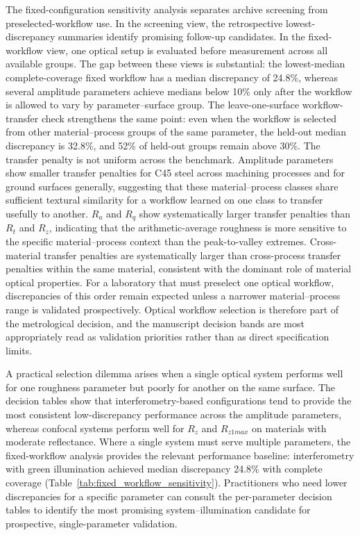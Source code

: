 \documentclass{article}
\begin{document}
The fixed-configuration sensitivity analysis separates archive screening from preselected-workflow use. In the screening view, the retrospective lowest-discrepancy summaries identify promising follow-up candidates. In the fixed-workflow view, one optical setup is evaluated before measurement across all available groups. The gap between these views is substantial: the lowest-median complete-coverage fixed workflow has a median discrepancy of 24.8\%, whereas several amplitude parameters achieve medians below 10\% only after the workflow is allowed to vary by parameter--surface group. The leave-one-surface workflow-transfer check strengthens the same point: even when the workflow is selected from other material--process groups of the same parameter, the held-out median discrepancy is 32.8\%, and 52\% of held-out groups remain above 30\%. The transfer penalty is not uniform across the benchmark. Amplitude parameters show smaller transfer penalties for C45 steel across machining processes and for ground surfaces generally, suggesting that these material--process classes share sufficient textural similarity for a workflow learned on one class to transfer usefully to another. $R_a$ and $R_q$ show systematically larger transfer penalties than $R_t$ and $R_z$, indicating that the arithmetic-average roughness is more sensitive to the specific material--process context than the peak-to-valley extremes. Cross-material transfer penalties are systematically larger than cross-process transfer penalties within the same material, consistent with the dominant role of material optical properties. For a laboratory that must preselect one optical workflow, discrepancies of this order remain expected unless a narrower material--process range is validated prospectively. Optical workflow selection is therefore part of the metrological decision, and the manuscript decision bands are most appropriately read as validation priorities rather than as direct specification limits.

A practical selection dilemma arises when a single optical system performs well for one roughness parameter but poorly for another on the same surface. The decision tables show that interferometry-based configurations tend to provide the most consistent low-discrepancy performance across the amplitude parameters, whereas confocal systems perform well for $R_z$ and $R_{z1max}$ on materials with moderate reflectance. Where a single system must serve multiple parameters, the fixed-workflow analysis provides the relevant performance baseline: interferometry with green illumination achieved median discrepancy 24.8\% with complete coverage (Table~\ref{tab:fixed_workflow_sensitivity}). Practitioners who need lower discrepancies for a specific parameter can consult the per-parameter decision tables to identify the most promising system--illumination candidate for prospective, single-parameter validation.
\end{document}
